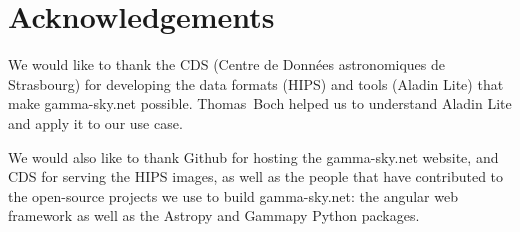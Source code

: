 \section{Acknowledgements}

We would like to thank the CDS (Centre de Donn\'{e}es astronomiques de Strasbourg) for developing the data formats (HIPS) and tools (Aladin Lite) that make gamma-sky.net possible. Thomas~Boch helped us to understand Aladin Lite and apply it to our use case.

We would also like to thank Github for hosting the gamma-sky.net website, and CDS for serving the HIPS images, as well as the people that have contributed to the open-source projects we use to build gamma-sky.net: the angular web framework as well as the Astropy and Gammapy Python packages.
